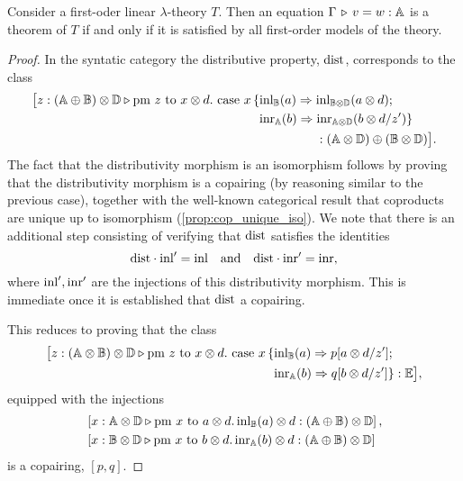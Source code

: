  \begin{proposition}
  Consider a first-oder linear $\lambda$-theory $T$. Then an equation 
$\Gamma \, \triangleright \, v = w : \mathbb{A}$
is a theorem of $T$ if and only if it is satisfied by all first-order models of the theory.
 \end{proposition}

 \begin{proof}

  In the syntatic category the distributive property, $\mathrm{dist}$, corresponds to the class 
  \begin{align*}
    \big[z:(\mathbb{A} \oplus \mathbb{\mathbb{B}}) \otimes \mathbb{\mathbb{D}} \triangleright \text{pm } z \text{ to } x \otimes d. \text{ case } x\,\{ &\mathrm{inl}_{\mathbb{B}}(a) \Rightarrow \mathrm{inl}_{\mathbb{B} \otimes \mathbb{D}}(a \otimes d); \\
    & \mathrm{inr}_{\mathbb{A}}(b) \Rightarrow \mathrm{inr}_{\mathbb{A} \otimes \mathbb{D}}(b \otimes d/z')\} \\
    & \hspace{45pt}: (\mathbb{A} \otimes \mathbb{D}) \oplus (\mathbb{B} \otimes \mathbb{D}) \big].
  \end{align*} 
  The fact that the distributivity morphism is an isomorphism follows by
  proving that the distributivity morphism  is a copairing (by reasoning similar to the previous case), together with the well-known categorical result that coproducts are unique up to isomorphism (\autoref{prop:cop_unique_iso}). We note that there is an additional step consisting of verifying that \(\mathrm{dist}\) satisfies the identities
\[
\mathrm{dist} \cdot \mathrm{inl}' = \mathrm{inl} \quad \text{and} \quad \mathrm{dist} \cdot \mathrm{inr}' = \mathrm{inr},
\]
where $\mathrm{inl}', \mathrm{inr}'$ are the injections of this distributivity morphism. This is immediate once it is established that \(\mathrm{dist}\) a copairing.

This reduces to proving that the class
 \begin{align*}
    \big[z:(\mathbb{A} \otimes \mathbb{\mathbb{B}}) \otimes \mathbb{\mathbb{D}} \triangleright \text{pm } z \text{ to } x \otimes d. \text{ case } x\,\{ &\mathrm{inl}_{\mathbb{B}}(a) \Rightarrow p[a \otimes d/z']; \\
    & \mathrm{inr}_{\mathbb{A}}(b) \Rightarrow q [b \otimes d/z']\}: \mathbb{E} \big],
  \end{align*} 
equipped with the injections
 \begin{align*}
    & \left[ x: \mathbb{A} \otimes \mathbb{D} \triangleright\text{pm }x \text{ to } a\otimes d. \, \mathrm{inl}_{\mathbb{B}}(a) \otimes d : (\mathbb{A} \oplus \mathbb{B}) \otimes \mathbb{D}   \right],\\
    & \left[ x: \mathbb{B} \otimes \mathbb{D} \triangleright\text{pm }x \text{ to } b\otimes d. \, \mathrm{inr}_{\mathbb{A}}(b) \otimes d : (\mathbb{A} \oplus \mathbb{B}) \otimes \mathbb{D}   \right]
  \end{align*}
is a copairing, $[p,q]$.


\end{proof}
